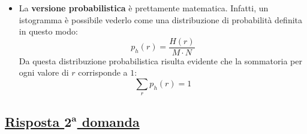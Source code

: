 \documentclass[a4paper]{article}
\begin{document}
\begin{itemize}
		\item La \textbf{versione probabilistica} è prettamente matematica. Infatti, un istogramma è possibile vederlo come una distribuzione di probabilità definita in questo modo:
		\begin{equation*}
			p_{h}\left(r\right) = \dfrac{H\left(r\right)}{M \cdot N}
		\end{equation*}
		Da questa distribuzione probabilistica risulta evidente che la sommatoria per ogni valore di $r$ corrisponde a $1$:
		\begin{equation*}
			\sum_{r} p_{h}\left(r\right) = 1
		\end{equation*}
	\end{itemize}\newpage
	
	\subsection*{\textcolor{Green4}{\underline{Risposta $\boldsymbol{2^{a}}$ domanda}}}
	
\end{document}
